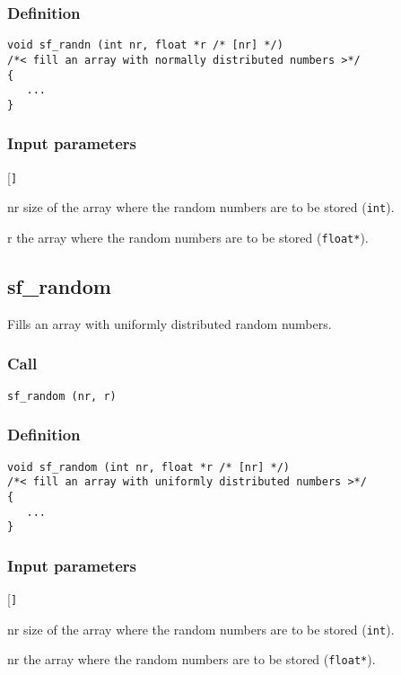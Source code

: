 \subsubsection*{Definition}
\begin{verbatim}
void sf_randn (int nr, float *r /* [nr] */)
/*< fill an array with normally distributed numbers >*/
{
   ...
}
\end{verbatim}

\subsubsection*{Input parameters}
\begin{desclist}{\tt }{\quad}[\tt ]
   \setlength\itemsep{0pt}
   \item[nr] size of the array where the random numbers are to be stored (\texttt{int}). 
   \item[r] the array where the random numbers are to be stored (\texttt{float*}).
\end{desclist}




\subsection{{sf\_random}}
Fills an array with uniformly distributed random numbers.

\subsubsection*{Call}
\begin{verbatim}sf_random (nr, r)\end{verbatim}

\subsubsection*{Definition}
\begin{verbatim}
void sf_random (int nr, float *r /* [nr] */)
/*< fill an array with uniformly distributed numbers >*/
{
   ...
}
\end{verbatim}

\subsubsection*{Input parameters}
\begin{desclist}{\tt }{\quad}[\tt ]
   \setlength\itemsep{0pt}
   \item[nr] size of the array where the random numbers are to be stored (\texttt{int}). 
   \item[nr] the array where the random numbers are to be stored (\texttt{float*}).
\end{desclist}



